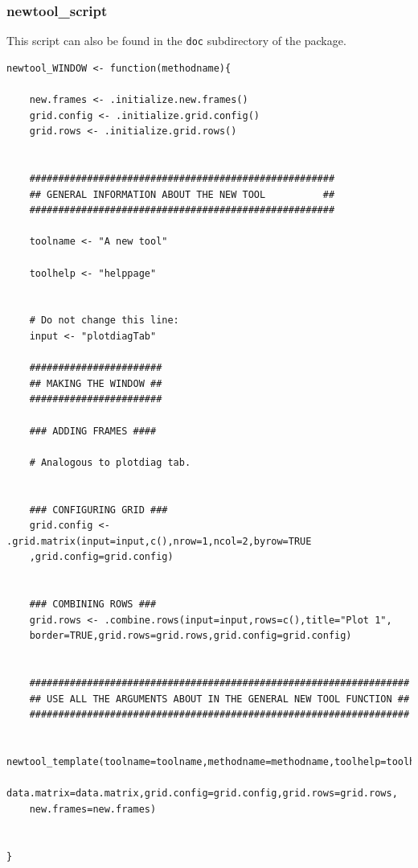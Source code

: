 \documentclass[a4paper]{article}\usepackage[]{graphicx}\usepackage[]{color}
\begin{document}
\subsubsection{newtool\_script}
\noindent This script can also be found in the \verb|doc| subdirectory of the
package.
\begin{verbatim}
newtool_WINDOW <- function(methodname){  
	
	new.frames <- .initialize.new.frames()
	grid.config <- .initialize.grid.config()
	grid.rows <- .initialize.grid.rows()
	
	
	#####################################################
	## GENERAL INFORMATION ABOUT THE NEW TOOL		   ##
	#####################################################
		
	toolname <- "A new tool"
	
	toolhelp <- "helppage"
	
	
	# Do not change this line:
	input <- "plotdiagTab"
	
	#######################
	## MAKING THE WINDOW ##
	#######################
	
	### ADDING FRAMES ####
	
	# Analogous to plotdiag tab.
	
	
	### CONFIGURING GRID ###
	grid.config <- .grid.matrix(input=input,c(),nrow=1,ncol=2,byrow=TRUE
    ,grid.config=grid.config)
	
	
	### COMBINING ROWS ###
	grid.rows <- .combine.rows(input=input,rows=c(),title="Plot 1",
    border=TRUE,grid.rows=grid.rows,grid.config=grid.config)
	
	
	##################################################################
	## USE ALL THE ARGUMENTS ABOUT IN THE GENERAL NEW TOOL FUNCTION ##
	##################################################################
	
	newtool_template(toolname=toolname,methodname=methodname,toolhelp=toolhelp,
    data.matrix=data.matrix,grid.config=grid.config,grid.rows=grid.rows,
    new.frames=new.frames)
	
	
}

\end{verbatim}
\end{document}
